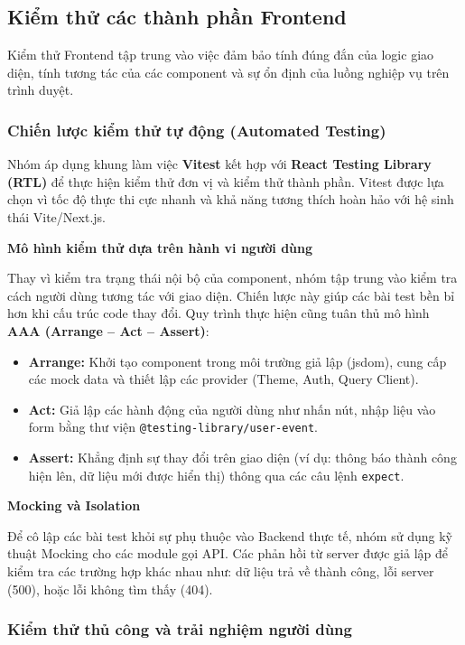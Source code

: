 \subsection{Kiểm thử các thành phần Frontend}

Kiểm thử Frontend tập trung vào việc đảm bảo tính đúng đắn của logic giao diện, tính tương tác của các component và sự ổn định của luồng nghiệp vụ trên trình duyệt.

\subsubsection{Chiến lược kiểm thử tự động (Automated Testing)}

Nhóm áp dụng khung làm việc \textbf{Vitest} kết hợp với \textbf{React Testing Library (RTL)} để thực hiện kiểm thử đơn vị và kiểm thử thành phần. Vitest được lựa chọn vì tốc độ thực thi cực nhanh và khả năng tương thích hoàn hảo với hệ sinh thái Vite/Next.js.

\textbf{Mô hình kiểm thử dựa trên hành vi người dùng}

Thay vì kiểm tra trạng thái nội bộ của component, nhóm tập trung vào kiểm tra cách người dùng tương tác với giao diện. Chiến lược này giúp các bài test bền bỉ hơn khi cấu trúc code thay đổi. Quy trình thực hiện cũng tuân thủ mô hình \textbf{AAA (Arrange -- Act -- Assert)}:
\begin{itemize}
    \item \textbf{Arrange:} Khởi tạo component trong môi trường giả lập (jsdom), cung cấp các mock data và thiết lập các provider (Theme, Auth, Query Client).
    \item \textbf{Act:} Giả lập các hành động của người dùng như nhấn nút, nhập liệu vào form bằng thư viện \texttt{@testing-library/user-event}.
    \item \textbf{Assert:} Khẳng định sự thay đổi trên giao diện (ví dụ: thông báo thành công hiện lên, dữ liệu mới được hiển thị) thông qua các câu lệnh \texttt{expect}.
\end{itemize}

\textbf{Mocking và Isolation}

Để cô lập các bài test khỏi sự phụ thuộc vào Backend thực tế, nhóm sử dụng kỹ thuật Mocking cho các module gọi API. Các phản hồi từ server được giả lập để kiểm tra các trường hợp khác nhau như: dữ liệu trả về thành công, lỗi server (500), hoặc lỗi không tìm thấy (404).

\subsubsection{Kiểm thử thủ công và trải nghiệm người dùng}

